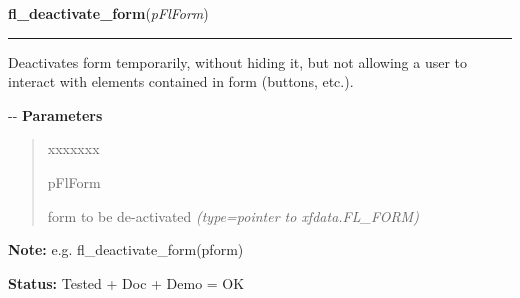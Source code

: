\hspace{.8\funcindent}\begin{boxedminipage}{\funcwidth}

    \raggedright \textbf{fl\_deactivate\_form}(\textit{pFlForm})

    \vspace{-1.5ex}

    \rule{\textwidth}{0.5\fboxrule}
\setlength{\parskip}{2ex}

Deactivates form temporarily, without hiding it, but not allowing a
user to interact with elements contained in form (buttons, etc.).

-{}-
\setlength{\parskip}{1ex}
      \textbf{Parameters}
      \vspace{-1ex}

      \begin{quote}
        \begin{Ventry}{xxxxxxx}

          \item[pFlForm]


form to be de-activated
            {\it (type=pointer to xfdata.FL\_FORM)}

        \end{Ventry}

      \end{quote}

\textbf{Note:} 
e.g. fl\_deactivate\_form(pform)


\textbf{Status:} 
Tested + Doc + Demo = OK


    \end{boxedminipage}

    \label{xformslib:flbasic:fl_activate_form}

    \vspace{0.5ex}

